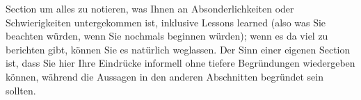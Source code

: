 
Section um alles zu notieren, was Ihnen an Absonderlichkeiten oder Schwierigkeiten untergekommen
ist, inklusive Lessons learned (also was Sie beachten würden, wenn Sie nochmals
beginnen würden); wenn es da viel zu berichten gibt, können Sie es
natürlich weglassen. Der Sinn einer eigenen Section ist, dass Sie hier
Ihre Eindrücke informell ohne tiefere Begründungen wiedergeben können,
während die Aussagen in den anderen Abschnitten begründet sein sollten.
